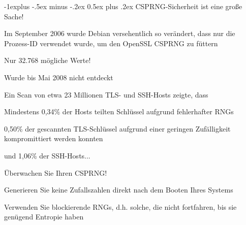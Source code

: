 \documentclass[a4paper]{article}
\makeatletter
\renewcommand{\subsection}{\@startsection{subsection}{2}{0mm}%
 {-1explus -.5ex minus -.2ex}%
 {0.5ex plus .2ex}%
 {\normalfont\normalsize\bfseries}}
\makeatother
\begin{document}
\begin{multicols}{3}
      \subsection{CSPRNG-Sicherheit ist eine große Sache!}
      \begin{itemize*}
            \item Im September 2006 wurde Debian versehentlich so verändert, dass nur
            die Prozess-ID verwendet wurde, um den OpenSSL CSPRNG zu füttern
            \begin{itemize*}
                  \item Nur 32.768 mögliche Werte!
                  \item Wurde bis Mai 2008 nicht entdeckt
            \end{itemize*}
            \item Ein Scan von etwa 23 Millionen TLS- und SSH-Hosts zeigte, dass
            \begin{itemize*}
                  \item Mindestens 0,34\% der Hosts teilten Schlüssel aufgrund fehlerhafter RNGs
                  \item 0,50\% der gescannten TLS-Schlüssel aufgrund einer geringen Zufälligkeit kompromittiert werden konnten
                  \item und 1,06\% der SSH-Hosts...
            \end{itemize*}
            \item Überwachen Sie Ihren CSPRNG!
            \begin{itemize*}
                  \item Generieren Sie keine Zufallszahlen direkt nach dem Booten Ihres Systems
                  \item Verwenden Sie blockierende RNGs, d.h. solche, die nicht fortfahren, bis sie genügend Entropie haben
            \end{itemize*}
      \end{itemize*}


\end{multicols}
\end{document}
